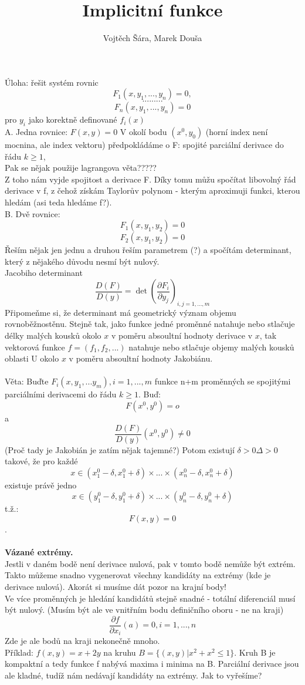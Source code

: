 \documentclass{article}
\title{Implicitní funkce}
\author{Vojtěch Šára, Marek Douša}
\begin{document}
\maketitle
Úloha: řešit systém rovnic
$$F_{1}(x,y_{1},...,y_{n}) = 0,$$
$$... ... ...$$
$$F_{n}(x,y_{1},...,y_{n}) = 0 $$
pro $y_{i}$ jako korektně definované $f_{i}(x)$\\
A. Jedna rovnice: $F(x,y) = 0$ V okolí bodu $(x^{0},y_{0})$ (horní index není mocnina, ale index vektoru)
předpokládáme o F: spojité parciální derivace do řádu $k \geq 1$,\\
Pak se nějak použije lagrangova věta?????\\
Z toho nám vyjde spojitost a derivace F. Díky tomu můžu spočítat libovolný řád derivace v
f, z čehož získám Taylorův polynom - kterým aproximuji funkci, kterou hledám (asi teda hledáme f?).\\
B. Dvě rovnice: 
$$F_{1}(x,y_{1},y_{2}) = 0$$
$$F_{2}(x,y_{1},y_{2}) = 0$$
Řeším nějak jen jednu a druhou řeším parametrem (?) a spočítám determinant, který z
nějakého důvodu nesmí být nulový.\\
Jacobiho determinant 
$$\frac{D(F)}{D(y)} = \det(\frac{\partial F_{i}}{\partial y_{j}})_{i,j=1,...,m}$$
Připomeňme si, že determinant má geometrický význam objemu rovnoběžnostěnu. Stejně tak,
jako funkce jedné proměnné natahuje nebo stlačuje délky malých kousků okolo $x$ v poměru
absoultní hodnoty derivace v $x$, tak vektorová funkce $f = (f_{1},f_{2},...)$ natahuje nebo stlačuje objemy
malých kousků oblasti U okolo $x$ v poměru absoultní hodnoty Jakobiánu.\\\\
Věta: Buďte $F_{i}(x,y_{1},...y_{m}), i = 1,...,m$ funkce n+m proměnných se spojitými
parciálními derivacemi do řádu $k \geq 1$. Buď:
$$F(x^{0},y^{0}) = o$$
a 
$$\frac{D(F)}{D(y)}(x^{0},y^{0}) \neq 0$$
(Proč tady je Jakobián je zatím nějak tajemné?) Potom existují $\delta > 0 \Delta > 0$
takové, že pro každé 
$$x \in (x_{1}^{0}-\delta, x_{1}^{0} +\delta) \times ... \times (x_{n}^{0}-\delta, x_{n}^{0} +\delta)$$
existuje právě jedno
$$x \in (y_{1}^{0}-\delta, y_{1}^{0} +\delta) \times ... \times (y_{n}^{0}-\delta, y_{n}^{0} +\delta)$$
t.ž.: $$F(x,y) = 0$$.\\\\

\textbf{Vázané extrémy.}\\
Jestli v daném bodě není derivace nulová, pak v tomto bodě nemůže být extrém. Takto
můžeme snadno vygenerovat všechny kandidáty na extrémy (kde je derivace nulová).
Akorát si musíme dát pozor na krajní body!\\
Ve více proměnných je hledání kandidátů stejně snadné - totální diferenciál musí 
být nulový. (Musím být ale ve vnitřním bodu definičního oboru - ne na kraji)
$$\frac{\partial f}{\partial x_{i}}(a) = 0, i=1,...,n$$
Zde je ale bodů na kraji nekonečně mnoho.\\
Příklad: $f(x,y) = x+2y$ na kruhu $B = \{(x,y)|x^{2}+x^{2}\leq 1\}$. Kruh B je 
kompaktní a tedy funkce f nabývá maxima i minima na B. Parciální derivace jsou ale
kladné, tudíž nám nedávají kandidáty na extrémy. Jak to vyřešíme?\\\\
\end{document}
